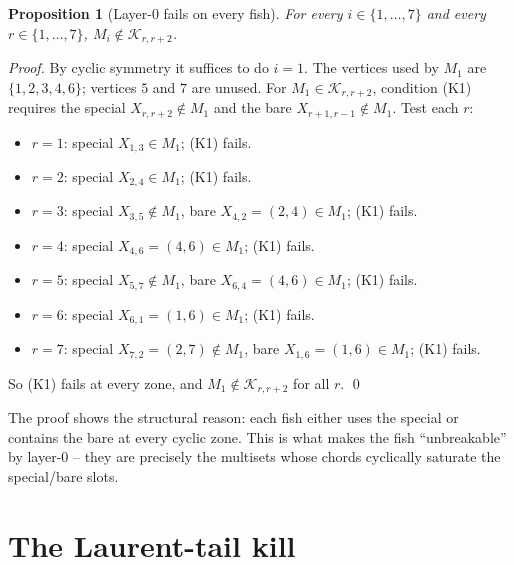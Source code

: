\documentclass[11pt]{article}
\newtheorem{prop}[thm]{Proposition}
\theoremstyle{definition}
\begin{document}
\begin{prop}[Layer-0 fails on every fish]\label{prop:layer0fails}
For every $i\in\{1,\dots,7\}$ and every $r\in\{1,\dots,7\}$,
$M_i\notin\mathcal{K}_{r,r+2}$.
\end{prop}

\begin{proof}
By cyclic symmetry it suffices to do $i=1$. The vertices used by $M_1$
are $\{1,2,3,4,6\}$; vertices $5$ and $7$ are unused. For
$M_1\in\mathcal{K}_{r,r+2}$, condition (K1) requires the special
$X_{r,r+2}\notin M_1$ and the bare $X_{r+1,r-1}\notin M_1$. Test each
$r$:
\begin{itemize}[leftmargin=*,topsep=1pt,parsep=0pt,itemsep=1pt]
\item $r=1$: special $X_{1,3}\in M_1$; (K1) fails.
\item $r=2$: special $X_{2,4}\in M_1$; (K1) fails.
\item $r=3$: special $X_{3,5}\notin M_1$, bare $X_{4,2}=(2,4)\in M_1$;
       (K1) fails.
\item $r=4$: special $X_{4,6}=(4,6)\in M_1$; (K1) fails.
\item $r=5$: special $X_{5,7}\notin M_1$, bare $X_{6,4}=(4,6)\in M_1$;
       (K1) fails.
\item $r=6$: special $X_{6,1}=(1,6)\in M_1$; (K1) fails.
\item $r=7$: special $X_{7,2}=(2,7)\notin M_1$, bare
       $X_{1,6}=(1,6)\in M_1$; (K1) fails.
\end{itemize}
So (K1) fails at every zone, and $M_1\notin\mathcal{K}_{r,r+2}$ for all
$r$. \qed
\end{proof}

The proof shows the structural reason: each fish either uses the special
or contains the bare at every cyclic zone. This is what makes the fish
``unbreakable'' by layer-0 -- they are precisely the multisets whose
chords cyclically saturate the special/bare slots.

\section{The Laurent-tail kill}
\end{document}
